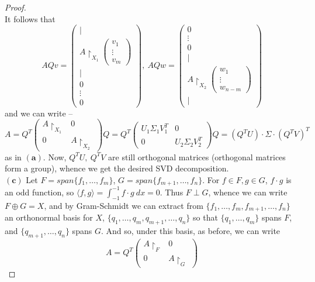 \documentclass[11pt]{article}
\theoremstyle{quest}
\begin{document}
\begin{proof}
\\It follows that
$$AQv = \begin{pmatrix}
| \\
A\restriction_{X_1} \begin{pmatrix}
v_1 \\
\vdots \\
v_m \end{pmatrix} \\
| \\
0 \\
\vdots \\
0
\end{pmatrix},\ AQw = \begin{pmatrix}
0 \\
\vdots \\
0 \\
| \\
A\restriction_{X_2} \begin{pmatrix}
w_1 \\
\vdots \\
w_{n-m} \end{pmatrix} \\
|
\end{pmatrix}$$
and we can write --
$$A = Q^T \begin{pmatrix}
A \restriction_{X_1} & 0 \\
0 & A \restriction_{X_2}
\end{pmatrix} Q = Q^T \begin{pmatrix}
U_1 \Sigma_1 V_1^T & 0 \\
0 & U_2 \Sigma_2 V_2^T
\end{pmatrix} Q = (Q^TU) \cdot \Sigma \cdot (Q^TV)^T$$
as in $\mathbf{(a)}$. Now, $Q^TU,\ Q^TV$ are still orthogonal matrices (orthogonal matrices form a group), whence we get the desired SVD decomposition.
\\$\mathbf{(c)}$ Let $F = span \{f_1, \ldots, f_m\}$, $G = span \{f_{m+1}, \ldots, f_n\}$. For $f \in F, g \in G$, $f \cdot g$ is an odd function, so $\langle f, g \rangle = \int_{-1}^{-1} f \cdot g\ dx = 0$. Thus $F \perp G$, whence we can write $F \oplus G = X$, and by Gram-Schmidt we can extract from $\{f_1, \ldots, f_m, f_{m+1}, \ldots, f_n\}$ an orthonormal basis for $X$, $\{q_1, \ldots, q_m, q_{m+1}, \ldots, q_n\}$ so that $\{q_1, \ldots, q_m\}$ spans $F$, and $\{q_{m+1}, \ldots, q_n\}$ spans $G$. 
And so, under this basis, as before, we can write
$$A = Q^T \begin{pmatrix}
A \restriction_F & 0 \\
0 & A \restriction_G

\end{pmatrix}$$
\end{proof}
\end{document}
